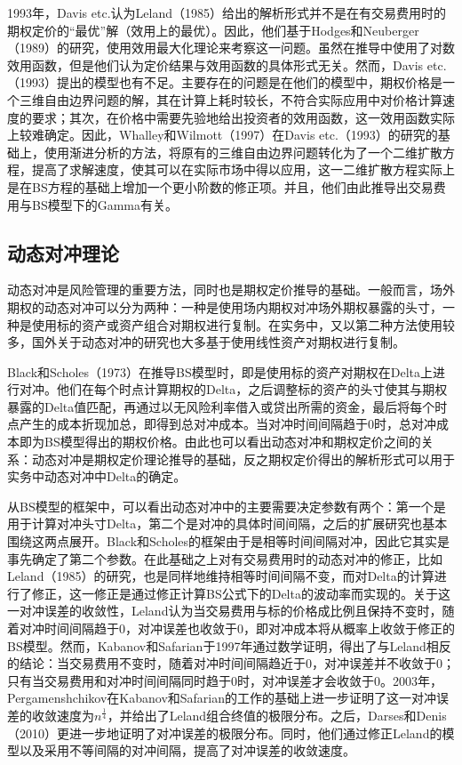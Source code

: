 1993年，Davis etc.\cite{davis1993european}认为Leland（1985）\cite{leland1985option}给出的解析形式并不是在有交易费用时的期权定价的“最优”解（效用上的最优）。因此，他们基于Hodges和Neuberger（1989）\cite{hodges1989optimal}的研究，使用效用最大化理论来考察这一问题。虽然在推导中使用了对数效用函数，但是他们认为定价结果与效用函数的具体形式无关。然而，Davis etc.（1993）\cite{davis1993european}提出的模型也有不足。主要存在的问题是在他们的模型中，期权价格是一个三维自由边界问题的解，其在计算上耗时较长，不符合实际应用中对价格计算速度的要求；其次，在价格中需要先验地给出投资者的效用函数，这一效用函数实际上较难确定。因此，Whalley和Wilmott（1997）\cite{whalley1997asymptotic}在Davis etc.（1993）\cite{davis1993european}的研究的基础上，使用渐进分析的方法，将原有的三维自由边界问题转化为了一个二维扩散方程，提高了求解速度，使其可以在实际市场中得以应用，这一二维扩散方程实际上是在BS方程的基础上增加一个更小阶数的修正项。并且，他们由此推导出交易费用与BS模型下的Gamma有关。

\subsection{动态对冲理论}

动态对冲是风险管理的重要方法，同时也是期权定价推导的基础。一般而言，场外期权的动态对冲可以分为两种：一种是使用场内期权对冲场外期权暴露的头寸，一种是使用标的资产或资产组合对期权进行复制。在实务中，又以第二种方法使用较多，国外关于动态对冲的研究也大多基于使用线性资产对期权进行复制。

Black和Scholes（1973）\cite{black1973pricing}在推导BS模型时，即是使用标的资产对期权在Delta上进行对冲。他们在每个时点计算期权的Delta，之后调整标的资产的头寸使其与期权暴露的Delta值匹配，再通过以无风险利率借入或贷出所需的资金，最后将每个时点产生的成本折现加总，即得到总对冲成本。当对冲时间间隔趋于0时，总对冲成本即为BS模型得出的期权价格。由此也可以看出动态对冲和期权定价之间的关系：动态对冲是期权定价理论推导的基础，反之期权定价得出的解析形式可以用于实务中动态对冲中Delta的确定。

从BS模型的框架中，可以看出动态对冲中的主要需要决定参数有两个：第一个是用于计算对冲头寸Delta，第二个是对冲的具体时间间隔，之后的扩展研究也基本围绕这两点展开。Black和Scholes的框架由于是相等时间间隔对冲，因此它其实是事先确定了第二个参数。在此基础之上对有交易费用时的动态对冲的修正，比如Leland（1985）\cite{leland1985option}的研究，也是同样地维持相等时间间隔不变，而对Delta的计算进行了修正，这一修正是通过修正计算BS公式下的Delta的波动率而实现的。关于这一对冲误差的收敛性，Leland认为当交易费用与标的价格成比例且保持不变时，随着对冲时间间隔趋于0，对冲误差也收敛于0，即对冲成本将从概率上收敛于修正的BS模型。然而，Kabanov和Safarian\cite{kabanov1997leland}于1997年通过数学证明，得出了与Leland相反的结论：当交易费用不变时，随着对冲时间间隔趋近于0，对冲误差并不收敛于0；只有当交易费用和对冲时间间隔同时趋于0时，对冲误差才会收敛于0。2003年，Pergamenshchikov\cite{pergamenshchikov2003limit}在Kabanov和Safarian的工作的基础上进一步证明了这一对冲误差的收敛速度为$n^{\frac{1}{4}}$，并给出了Leland组合终值的极限分布。之后，Darses和Denis（2010）\cite{darses:hal-00467704}更进一步地证明了对冲误差的极限分布。同时，他们通过修正Leland的模型以及采用不等间隔的对冲间隔，提高了对冲误差的收敛速度。

